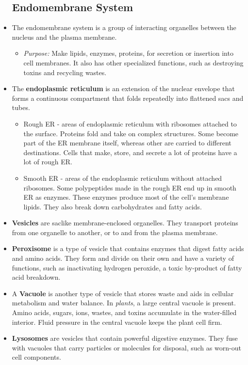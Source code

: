 \documentclass[letterpaper]{article}
\begin{document}
\begin{itemize}
    \subsection{Endomembrane System}
    \item The endomembrane system is a group of interacting organelles between the nucleus and the plasma membrane.
    \begin{itemize}
        \item \textit{Purpose: } Make lipids, enzymes, proteins, for secretion or insertion into cell membranes. It also has other specialized functions, such as destroying toxins and recycling wastes.
    \end{itemize}
    \item The \textbf{endoplasmic reticulum} is an extension of the nuclear envelope that forms a continuous compartment that folds repeatedly into flattened sacs and tubes.
    \begin{itemize}
        \item Rough ER - areas of endoplasmic reticulum with ribosomes attached to the surface. Proteins fold and take on complex structures. Some become part of the ER membrane itself, whereas other are carried to different destinations. Cells that make, store, and secrete a lot of proteins have a lot of rough ER.
        \item Smooth ER - areas of the endoplasmic reticulum without attached ribosomes. Some polypeptides made in the rough ER end up in smooth ER as enzymes. These enzymes produce most of the cell’s membrane lipids. They also break down carbohydrates and fatty acids.
    \end{itemize}
    \item \textbf{Vesicles} are saclike membrane-enclosed organelles. They transport proteins from one organelle to another, or to and from the plasma membrane.
    \item \textbf{Peroxisome} is a type of vesicle that contains enzymes that digest fatty acids and amino acids. They form and divide on their own and have a variety of functions, such as inactivating hydrogen peroxide, a toxic by-product of fatty acid breakdown.
    \item A \textbf{Vacuole} is another type of vesicle that stores waste and aids in cellular metabolism and water balance. In \textit{plants}, a large central vacuole is present. Amino acids, sugars, ions, wastes, and toxins accumulate in the water-filled interior. Fluid pressure in the central vacuole keeps the plant cell firm.
    \item \textbf{Lysosomes} are vesicles that contain powerful digestive enzymes. They fuse with vacuoles that carry particles or molecules for disposal, such as worn-out cell components.

\end{itemize}
\end{document}

